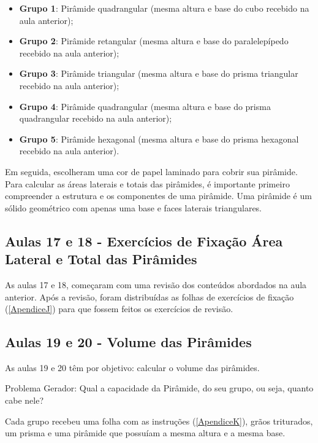 \begin{itemize}
    \item \textbf{Grupo 1}: Pirâmide quadrangular (mesma altura e base do cubo recebido na aula anterior);
    \item \textbf{Grupo 2}: Pirâmide retangular (mesma altura e base do paralelepípedo recebido na aula anterior);
    \item \textbf{Grupo 3}: Pirâmide triangular (mesma altura e base do prisma triangular recebido na aula anterior);
    \item \textbf{Grupo 4}: Pirâmide quadrangular (mesma altura e base do prisma quadrangular recebido na aula anterior);
    \item \textbf{Grupo 5}: Pirâmide hexagonal (mesma altura e base do prisma hexagonal recebido na aula anterior).
\end{itemize}

Em seguida, escolheram uma cor de papel laminado para cobrir sua pirâmide. Para calcular as áreas laterais e totais das pirâmides, é importante primeiro compreender a estrutura e os componentes de uma pirâmide. Uma pirâmide é um sólido geométrico com apenas uma base e faces laterais triangulares.

\subsection{Aulas 17 e 18 - Exercícios de Fixação Área Lateral e Total das Pirâmides}

As aulas 17 e 18, começaram com uma revisão dos conteúdos abordados na aula anterior. Após a revisão, foram distribuídas as folhas de exercícios de fixação (\autoref{ApendiceJ}) para que fossem feitos os exercícios de revisão.

\subsection{Aulas 19 e 20 - Volume das Pirâmides}

As aulas 19 e 20 têm por objetivo: calcular o volume das pirâmides.

Problema Gerador: Qual a capacidade da Pirâmide, do seu grupo, ou seja, quanto cabe nele?

Cada grupo recebeu uma folha com as instruções (\autoref{ApendiceK}), grãos triturados, um prisma e uma pirâmide que possuíam a mesma altura e a mesma base.

